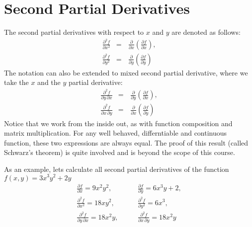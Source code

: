 \documentclass[letterpaper,10pt,english]{jupyterBook}
\begin{document}
\section{Second Partial Derivatives}
\label{\detokenize{VectorCalculus/partialdifferentiation:second-partial-derivatives}}
\sphinxAtStartPar
The second partial derivatives with respect to \(x\) and \(y\) are denoted as follows:
\begin{equation*}
\begin{split}\frac{\partial^2 f}{\partial x^2} &=&\, \frac{\partial}{\partial x}\left(\frac{\partial f}{\partial x}\right), \\
\frac{\partial^2 f}{\partial y^2} &=&\, \frac{\partial}{\partial y}\left(\frac{\partial f}{\partial y}\right)\end{split}
\end{equation*}
\sphinxAtStartPar
The notation can also be extended to mixed second partial derivative, where we take the \(x\) and the \(y\) partial derivative:
\begin{equation*}
\begin{split}\frac{\partial^2 f}{\partial y \,\partial x} &=&\, \frac{\partial}{\partial y}\left(\frac{\partial f}{\partial x}\right), \\
\frac{\partial^2 f}{\partial x\, \partial y} &=&\, \frac{\partial}{\partial x}\left(\frac{\partial f}{\partial y}\right)\end{split}
\end{equation*}
\sphinxAtStartPar
Notice that we work from the inside out, as with function composition and matrix multiplication.  For any well behaved, differntiable and continuous function,
these two expressions are always equal.  The proof of this result (called Schwarz’s theorem) is quite involved and is beyond the scope of this course.

\sphinxAtStartPar
As an example, lets calculate all second partial derivatives of the function \(f(x,y)=3x^3y^2+2y\)
\begin{equation*}
\begin{split}\frac{\partial f}{\partial x} = 9 x^2 y^2, &\quad&\, \frac{\partial f}{\partial y} = 6 x^3 y + 2, \\
\frac{\partial^2 f}{\partial x^2} = 18x y^2, &\quad&\, \frac{\partial^2 f}{\partial y^2} = 6x^3, \\
\frac{\partial^2 f}{\partial y\,\partial x} = 18x^2 y, &\quad&\, \frac{\partial^2 f}{\partial x\,\partial y} = 18x^2 y \end{split}
\end{equation*}
\end{document}

